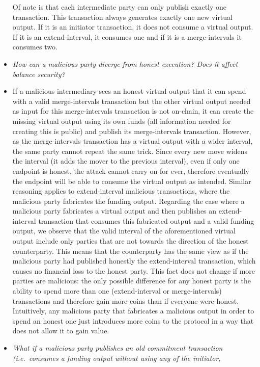\begin{itemize}
  Of note is that each intermediate party can only publish exactly one
  transaction. This transaction always generates exactly one new virtual output.
  If it is an initiator transaction, it does not consume a virtual output. If it
  is an extend-interval, it consumes one and if it is a merge-intervals it
  consumes two.
  \item \emph{How can a malicious party diverge from honest execution? Does it
  affect balance security?}
  \item If a malicious intermediary sees an honest virtual output that it can
  spend with a valid merge-intervals transaction but the other virtual output
  needed as input for this merge-intervals transaction is not on-chain, it can
  create the missing virtual output using its own funds (all information needed
  for creating this is public) and publish its merge-intervals transaction.
  However, as the merge-intervals transaction has a virtual output with a wider
  interval, the same party cannot repeat the same trick. Since every new move
  widens the interval (it adds the mover to the previous interval), even if only
  one endpoint is honest, the attack cannot carry on for ever, therefore
  eventually the endpoint will be able to consume the virtual output as
  intended. Similar reasoning applies to extend-interval malicious transactions,
  where the malicious party fabricates the funding output. Regarding the case
  where a malicious party fabricates a virtual output and then publishes an
  extend-interval transaction that consumes this fabricated output and a valid
  funding output, we observe that the valid interval of the aforementioned
  virtual output include only parties that are not towards the direction of the
  honest counterparty. This means that the counterparty has the same view as if
  the malicious party had published honestly the extend-interval transaction,
  which causes no financial loss to the honest party. This fact does not change
  if more parties are malicious: the only possible difference for any honest
  party is the ability to spend more than one (extend-interval or
  merge-intervals) transactions and therefore gain more coins than if everyone
  were honest. Intuitively, any malicious party that fabricates a malicious
  output in order to spend an honest one just introduces more coins to the
  protocol in a way that does not allow it to gain value.
  \item \emph{What if a malicious party publishes an old commitment transaction
  (i.e.\ consumes a funding output without using any of the initiator,
}
\end{itemize}
